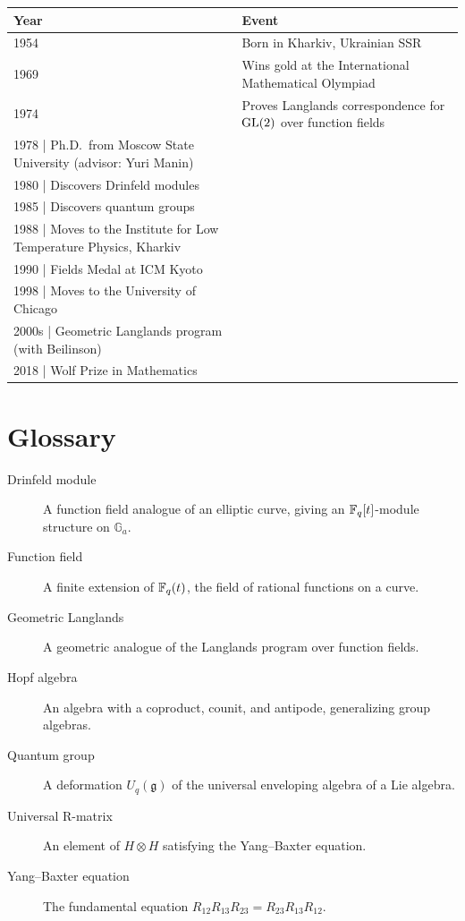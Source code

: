 \begin{tabularx}{\linewidth}{|p{1.5cm}|>{\raggedright\arraybackslash}X|}
\hline
\textbf{Year} & \textbf{Event} \\ \hline
1954 & Born in Kharkiv, Ukrainian SSR \\ \hline
1969 & Wins gold at the International Mathematical Olympiad \\ \hline
1974 & Proves Langlands correspondence for $\operatorname{GL}(2)$ over function fields \\ \hline
1978 | Ph.D.\ from Moscow State University (advisor: Yuri Manin) \\ \hline
1980 | Discovers Drinfeld modules \\ \hline
1985 | Discovers quantum groups \\ \hline
1988 | Moves to the Institute for Low Temperature Physics, Kharkiv \\ \hline
1990 | Fields Medal at ICM Kyoto \\ \hline
1998 | Moves to the University of Chicago \\ \hline
2000s | Geometric Langlands program (with Beilinson) \\ \hline
2018 | Wolf Prize in Mathematics \\ \hline
\end{tabularx}

\section*{Glossary}

\begin{description}
    \item[Drinfeld module] A function field analogue of an elliptic curve, giving an $\mathbb{F}_q[t]$-module structure on $\mathbb{G}_a$.
    \item[Function field] A finite extension of $\mathbb{F}_q(t)$, the field of rational functions on a curve.
    \item[Geometric Langlands] A geometric analogue of the Langlands program over function fields.
    \item[Hopf algebra] An algebra with a coproduct, counit, and antipode, generalizing group algebras.
    \item[Quantum group] A deformation $U_q(\mathfrak{g})$ of the universal enveloping algebra of a Lie algebra.
    \item[Universal R-matrix] An element of $H \otimes H$ satisfying the Yang--Baxter equation.
    \item[Yang--Baxter equation] The fundamental equation $R_{12}R_{13}R_{23} = R_{23}R_{13}R_{12}$.
\end{description}

